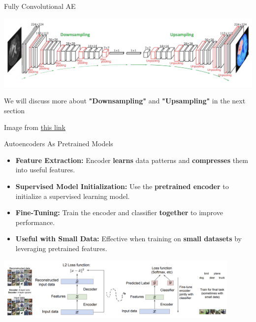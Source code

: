 \documentclass[serif, aspectratio=169]{beamer}
\begin{document}
\begin{frame}{Fully Convolutional AE}
    \begin{center}
        \includegraphics[width=\textwidth]{pic/Fully Convolutional AE 1.png} 
    \end{center}
    
    \vspace{0.5cm}
    
    \begin{center}
        We will discuss more about \textbf{"Downsampling"} and \textbf{"Upsampling"} in the next section
    \end{center}
    
    \vspace{1cm}
    
    \tiny{Image from \href{https://mriquestions.com/upsampling.html}{this link}}
\end{frame}

\begin{frame}{Autoencoders As Pretrained Models}
    \scriptsize
    \begin{itemize}
        \item \textbf{Feature Extraction:} Encoder \textbf{learns} data patterns and \textbf{compresses} them into useful features.
        \item \textbf{Supervised Model Initialization:} Use the \textbf{pretrained encoder} to initialize a supervised learning model.
        \item \textbf{Fine-Tuning:} Train the encoder and classifier \textbf{together} to improve performance.
        \item \textbf{Useful with Small Data:} Effective when training on \textbf{small datasets} by leveraging pretrained features.
    \end{itemize}
    
    \begin{center}
        \includegraphics[width=0.9\textwidth]{pic/AEs as pretrained models.png} 
    \end{center}
\end{frame}
\end{document}
